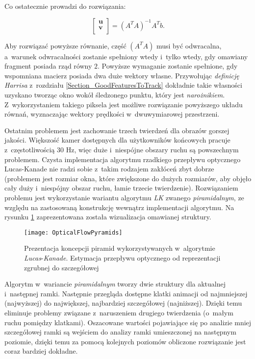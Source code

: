       Co ostatecznie prowadzi do rozwiązania:

        \[
          \begin{bmatrix}
            \mathbf{u} \\
            \mathbf{v} \\
          \end{bmatrix} = (A^{T}A)^{-1} A^{T}b.
        \]

      Aby rozwiązać powyższe równanie, część $(A^{T}A)$ musi być odwracalna, a~warunek odwracalności zostanie spełniony wtedy i~tylko wtedy, gdy omawiany fragment posiada rząd równy $2$. Powyższe wymaganie zostanie spełnione, gdy wspomniana macierz posiada dwa duże wektory własne. Przywołując \textit{definicję Harrisa} z~rozdziału \ref{Section_GoodFeaturesToTrack} dokładnie takie własności uzyskano tworząc okno wokół śledzonego punktu, który jest \textit{narożnikiem}. Z~wykorzystaniem takiego piksela jest możliwe rozwiązanie powyższego układu równań, wyznaczając wektory prędkości w~dwuwymiarowej przestrzeni.

      Ostatnim problemem jest zachowanie trzech twierdzeń dla obrazów gorszej jakości. Większość kamer dostępnych dla użytkowników końcowych pracuje z~częstotliwością 30 Hz, więc duże i~niespójne obszary ruchu są powszechnym problemem. Czysta implementacja algorytmu rzadkiego przepływu optycznego Lucas-Kanade nie radzi sobie z~takim rodzajem zakłóceń zbyt dobrze (problemem jest rozmiar okna, które zwiększone do dużych rozmiarów, aby objęło cały duży i~niespójny obszar ruchu, łamie trzecie twierdzenie). Rozwiązaniem problemu jest wykorzystanie wariantu algorytmu \textit{LK} zwanego \textit{piramidalnym}, ze względu na zastosowaną konstrukcję wewnątrz implementacji algorytmu. Na rysunku \ref{fig:OpticalFlowPyramids} zaprezentowana została wizualizacja omawianej struktury.

        \begin{figure}[!ht]
          \centering
          \texttt{[image: OpticalFlowPyramids]}
          \caption[Prezentacja koncepcji piramid]{Prezentacja koncepcji piramid wykorzystywanych w~algorytmie \textit{Lucas}-\textit{Kanade}. Estymacja przepływu optycznego od reprezentacji zgrubnej do szczegółowej}
          \label{fig:OpticalFlowPyramids}
        \end{figure}

      Algorytm w~wariancie \textit{piramidalnym} tworzy dwie struktury dla aktualnej i~następnej ramki. Następnie przegląda dostępne klatki animacji od najmniejszej (najwyższej) do największej, najbardziej szczegółowej (najniższej). Dzięki temu eliminuje problemy związane z~naruszeniem drugiego twierdzenia (o~małym ruchu pomiędzy klatkami). Oszacowane wartości pojawiające się po analizie mniej szczegółowej ramki są wejściem do analizy ramki umieszczonej na następnym poziomie, dzięki temu za pomocą kolejnych poziomów obliczone rozwiązanie jest coraz bardziej dokładne.

